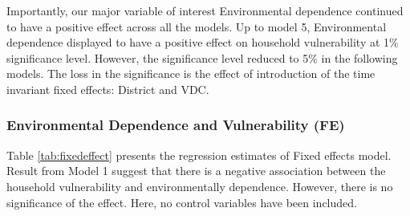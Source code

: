 Importantly, our major variable of interest Environmental dependence continued to have a positive effect across all the models.  Up to model 5, Environmental dependence displayed to have a positive effect on household vulnerability at 1\% significance level. However, the significance level reduced to 5\% in the following models. The loss in the significance is the effect of introduction of the time invariant fixed effects: District and VDC.

\subsubsection{Environmental Dependence and Vulnerability (FE)}
Table \ref{tab:fixedeffect} presents the regression estimates of Fixed effects model. Result from Model 1 suggest that there is a negative association between the household vulnerability and environmentally dependence. However, there is no significance of the effect. Here, no control variables have been included.  

